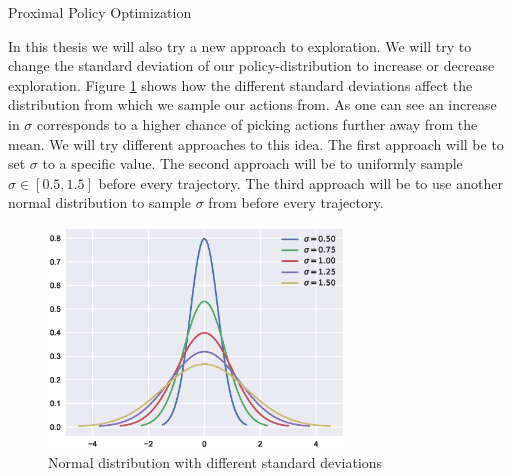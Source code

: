 \begin{algorithm}[H]
  \caption{Proximal Policy Optimization}
  \label{alg:ppo}
  \begin{algorithmic}[1]
		\EndFor
	\EndFor
  \end{algorithmic}
\end{algorithm}

In this thesis we will also try a new approach to exploration.
We will try to change the standard deviation of our policy-distribution to increase or decrease exploration.
Figure \ref{fig:normal_plot} shows how the different standard deviations affect the distribution from which we sample our actions from.
As one can see an increase in $\sigma$ corresponds to a higher chance of picking actions further away from the mean.
We will try different approaches to this idea.
The first approach will be to set $\sigma$ to a specific value.
The second approach will be to uniformly sample $\sigma \in [0.5,1.5]$ before every trajectory.
The third approach will be to use another normal distribution to sample $\sigma$ from before every trajectory.

\begin{figure}[H]
\centerline{
\includegraphics[width=0.7\textwidth]{images/normalPlot.eps}}
\caption{Normal distribution with different standard deviations}
\label{fig:normal_plot}
\end{figure}



